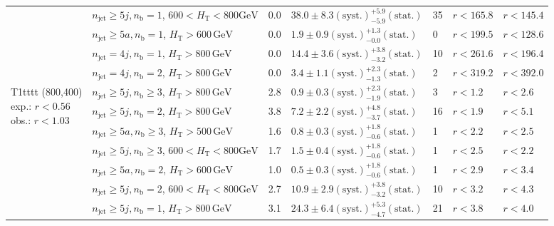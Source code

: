 \begin{table}[h!]
\begin{tabular}{ lllllll }
 & $n_{\mathrm{jet}} \geq5j,n_{\mathrm{b}} =1$, $600 < H_{\mathrm{T}} < 800 \mathrm{GeV}$ & 0.0 & $38.0 \pm 8.3 \mathrm{(syst.)} ^{+5.9}_{-5.9} \mathrm{(stat.)}$ & 35 & $r < 165.8$ & $r < 145.4$\\ 
 & $n_{\mathrm{jet}} \geq5a,n_{\mathrm{b}} =1$, $H_{\mathrm{T}} > 600 \, \mathrm{GeV}$ & 0.0 & $1.9 \pm 0.9 \mathrm{(syst.)} ^{+1.3}_{-0.0} \mathrm{(stat.)}$ & 0 & $r < 199.5$ & $r < 128.6$\\ 
 & $n_{\mathrm{jet}} =4j,n_{\mathrm{b}} =1$, $H_{\mathrm{T}} > 800 \, \mathrm{GeV}$ & 0.0 & $14.4 \pm 3.6 \mathrm{(syst.)} ^{+3.8}_{-3.2} \mathrm{(stat.)}$ & 10 & $r < 261.6$ & $r < 196.4$\\ 
 & $n_{\mathrm{jet}} =4j,n_{\mathrm{b}} =2$, $H_{\mathrm{T}} > 800 \, \mathrm{GeV}$ & 0.0 & $3.4 \pm 1.1 \mathrm{(syst.)} ^{+2.3}_{-1.3} \mathrm{(stat.)}$ & 2 & $r < 319.2$ & $r < 392.0$\\ \hline
\multirow{10}{*}{\parbox[t]{2cm}{T1tttt (800,400)\\exp.: $r<0.56$\\obs.: $r<1.03$}}
 & $n_{\mathrm{jet}} \geq5j,n_{\mathrm{b}} \geq3$, $H_{\mathrm{T}} > 800 \, \mathrm{GeV}$ & 2.8 & $0.9 \pm 0.3 \mathrm{(syst.)} ^{+2.3}_{-1.9} \mathrm{(stat.)}$ & 3 & $r < 1.2$ & $r < 2.6$\\ 
 & $n_{\mathrm{jet}} \geq5j,n_{\mathrm{b}} =2$, $H_{\mathrm{T}} > 800 \, \mathrm{GeV}$ & 3.8 & $7.2 \pm 2.2 \mathrm{(syst.)} ^{+4.8}_{-3.7} \mathrm{(stat.)}$ & 16 & $r < 1.9$ & $r < 5.1$\\ 
 & $n_{\mathrm{jet}} \geq5a,n_{\mathrm{b}} \geq3$, $H_{\mathrm{T}} > 500 \, \mathrm{GeV}$ & 1.6 & $0.8 \pm 0.3 \mathrm{(syst.)} ^{+1.8}_{-0.6} \mathrm{(stat.)}$ & 1 & $r < 2.2$ & $r < 2.5$\\ 
 & $n_{\mathrm{jet}} \geq5j,n_{\mathrm{b}} \geq3$, $600 < H_{\mathrm{T}} < 800 \mathrm{GeV}$ & 1.7 & $1.5 \pm 0.4 \mathrm{(syst.)} ^{+1.8}_{-0.6} \mathrm{(stat.)}$ & 1 & $r < 2.5$ & $r < 2.2$\\ 
 & $n_{\mathrm{jet}} \geq5a,n_{\mathrm{b}} =2$, $H_{\mathrm{T}} > 600 \, \mathrm{GeV}$ & 1.0 & $0.5 \pm 0.3 \mathrm{(syst.)} ^{+1.8}_{-0.6} \mathrm{(stat.)}$ & 1 & $r < 2.9$ & $r < 3.4$\\ 
 & $n_{\mathrm{jet}} \geq5j,n_{\mathrm{b}} =2$, $600 < H_{\mathrm{T}} < 800 \mathrm{GeV}$ & 2.7 & $10.9 \pm 2.9 \mathrm{(syst.)} ^{+3.8}_{-3.2} \mathrm{(stat.)}$ & 10 & $r < 3.2$ & $r < 4.3$\\ 
 & $n_{\mathrm{jet}} \geq5j,n_{\mathrm{b}} =1$, $H_{\mathrm{T}} > 800 \, \mathrm{GeV}$ & 3.1 & $24.3 \pm 6.4 \mathrm{(syst.)} ^{+5.3}_{-4.7} \mathrm{(stat.)}$ & 21 & $r < 3.8$ & $r < 4.0$\\ 

\end{tabular}
\end{table}
